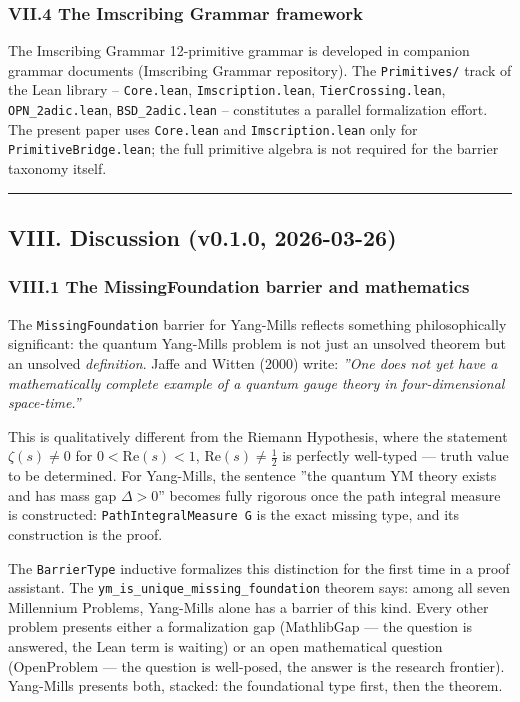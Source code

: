 \documentclass[12pt,a4paper]{article}
\begin{document}
\subsubsection{VII.4 The Imscribing Grammar framework}

The Imscribing Grammar 12-primitive grammar is developed in companion grammar documents (Imscribing Grammar repository). The \texttt{Primitives/} track of the Lean library  --  \texttt{Core.lean}, \texttt{Imscription.lean}, \texttt{TierCrossing.lean}, \texttt{OPN\_2adic.lean}, \texttt{BSD\_2adic.lean}  --  constitutes a parallel formalization effort. The present paper uses \texttt{Core.lean} and \texttt{Imscription.lean} only for \texttt{PrimitiveBridge.lean}; the full primitive algebra is not required for the barrier taxonomy itself.

\begin{center}
\rule{0.5\textwidth}{0.4pt}
\end{center}

\subsection{VIII. Discussion (v0.1.0, 2026-03-26)}

\subsubsection{VIII.1 The MissingFoundation barrier and mathematics}

The \texttt{MissingFoundation} barrier for Yang-Mills reflects something philosophically significant: the quantum Yang-Mills problem is not just an unsolved theorem but an unsolved \emph{definition}. Jaffe and Witten (2000) write: \emph{''One does not yet have a mathematically complete example of a quantum gauge theory in four-dimensional space-time.''}

This is qualitatively different from the Riemann Hypothesis, where the statement $\zeta(s) \neq 0$ for $0 < \text{Re}(s) < 1$, $\text{Re}(s) \neq \frac{1}{2}$ is perfectly well-typed --- truth value to be determined. For Yang-Mills, the sentence ''the quantum YM theory exists and has mass gap $\Delta > 0$'' becomes fully rigorous once the path integral measure is constructed: \texttt{PathIntegralMeasure G} is the exact missing type, and its construction is the proof.

The \texttt{BarrierType} inductive formalizes this distinction for the first time in a proof assistant. The \texttt{ym\_is\_unique\_missing\_foundation} theorem says: among all seven Millennium Problems, Yang-Mills alone has a barrier of this kind. Every other problem presents either a formalization gap (MathlibGap --- the question is answered, the Lean term is waiting) or an open mathematical question (OpenProblem --- the question is well-posed, the answer is the research frontier). Yang-Mills presents both, stacked: the foundational type first, then the theorem.
\end{document}
